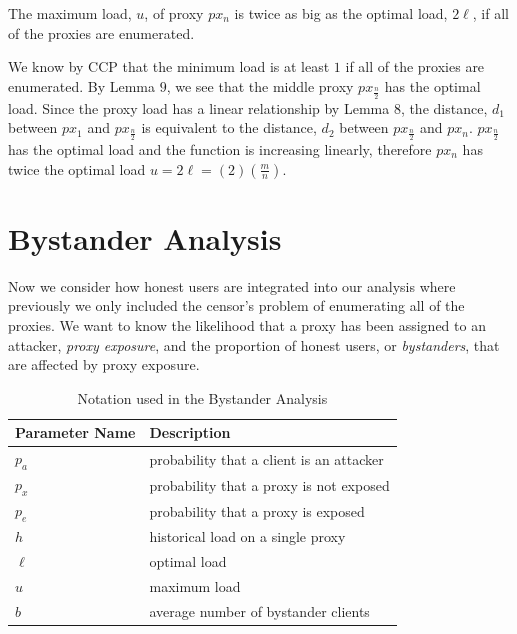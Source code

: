 \begin{theorem}{The maximum load, $u$, of proxy $px_n$ is twice as big as the optimal load, $2\ell$, if all of the proxies are enumerated.}

We know by CCP that the minimum load is at least $1$ if all of the proxies are enumerated. By Lemma $9$, we see that the middle proxy $px_{\frac{n}{2}}$ has the optimal load. Since the proxy load has a linear relationship by Lemma $8$, the distance, $d_1$ between $px_1$ and $px_{\frac{n}{2}}$ is equivalent to the distance, $d_2$ between $px_{\frac{n}{2}}$ and $px_n$. $px_{\frac{n}{2}}$ has the optimal load and the function is increasing linearly, therefore $px_{n}$ has twice the optimal load $u = 2\ell =(2)(\frac{m}{n})$.

\end{theorem}

\label{sec:bystander}
\section{Bystander Analysis}

Now we consider how honest users are integrated into our analysis where previously we only included the censor's problem of enumerating all of the proxies. We want to know the likelihood that a proxy has been assigned to an attacker, \textit{proxy exposure}, and the proportion of honest users, or \textit{bystanders}, that are affected by proxy exposure.

\begin{table}[h]
  \centering
	\begin{tabular}{ll}
	\hline
	\cline{1-2}
	Parameter Name    & Description  \\
	\hline
    $p_a$       & probability that a client is an attacker\\
    $p_x$     & probability that a proxy is not exposed \\
    $p_e$     & probability that a proxy is exposed \\
	$h$     & historical load on a single proxy  \\
	$\ell$     & optimal load \\
	$u$     & maximum load \\
	$b$     & average number of bystander clients\\

	\hline
	\end{tabular}
  \caption{Notation used in the Bystander Analysis}
  \label{tab:vars}
\end{table}

